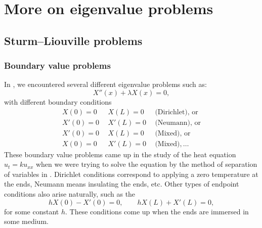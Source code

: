 \chapter{More on eigenvalue problems} \label{SL:chapter}


\section{Sturm--Liouville problems}
\label{slproblems:section}



\subsection{Boundary value problems}

In ,
we encountered several different eigenvalue problems such as:
\begin{equation*}
X''(x) + \lambda X(x) = 0 ,
\end{equation*}
with different boundary
conditions%
%
\begin{equation*}
\begin{array}{rrl}
X(0) = 0 & ~~X(L) = 0 & ~~\text{(Dirichlet), or} \\
X'(0) = 0 & ~~X'(L) = 0 & ~~\text{(Neumann), or} \\
X'(0) = 0 & ~~X(L) = 0 & ~~\text{(Mixed), or} \\
X(0) = 0 & ~~X'(L) = 0 & ~~\text{(Mixed)}, \ldots
\end{array}
\end{equation*}
These boundary value problems came up in the study of the heat equation $u_t =
k u_{xx}$ when we were trying to solve the equation by the method of
separation of variables in .
Dirichlet conditions correspond to applying a
zero temperature at the ends, Neumann means insulating the ends, etc.
Other types of endpoint conditions also arise naturally, such as
the \emph{}
\begin{equation*}
hX(0) - X'(0) = 0, \qquad hX(L) + X'(L) = 0 ,
\end{equation*}
for some constant $h$.  These conditions come up when the ends are immersed
in some medium.

